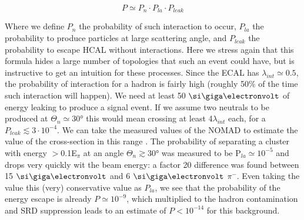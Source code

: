 \begin{equation}
  \label{eq:transverse-leak-estimate}
  P \simeq P_n \cdot P_{la} \cdot P_{leak}
\end{equation}

Where we define $P_n$ the probability of such interaction to occur, $P_{la}$ the probability to produce particles at large scattering angle, and $P_{leak}$ the probability to escape HCAL without interactions. Here we stress again that this formula hides a large number of topologies that such an event could have, but is instructive to get an intuition for these processes. Since the ECAL has $\lambda_{int} \simeq 0.5$, the probability of interaction for a hadron is fairly high (roughly 50\% of the time such interaction will happen). We need at least 50 $\gev$ of energy leaking to produce a signal event. If we assume two neutrals to be produced at $\Theta_{n} \simeq 30$\si{\degree} this would mean crossing at least 4$\lambda_{int}$ each, for a $P_{leak} \lesssim 3 \cdot 10^{-4}$. We can take the measured values of the NOMAD to estimate the value of the cross-section in this range \cite{AUTIERO1998285,GNINENKO1998583}. The probability of separating a cluster with energy $>$0.1E$_{\pi}$ at an angle $\Theta_{n} \gtrsim 30$\si{\degree} was measured to be P$_{la} \simeq 10^{-5}$ and drops very quickly wit the beam energy: a factor 20 difference was found between 15 $\gev$ and 6 $\gev$ $\pi^-$. Even taking the value this (very) conservative value as $P_{la}$, we see that the probability of the energy escape is already $P\simeq 10^{-9}$, which multiplied to the hadron contamination and SRD suppression leads to an estimate of $P<10^{-14}$ for this background.

